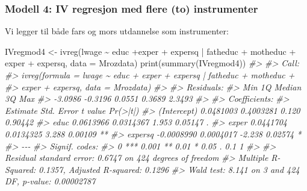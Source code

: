 \documentclass[
]{article}
\newenvironment{Shaded}{\begin{snugshade}}{\end{snugshade}}
\newcommand{\AttributeTok}[1]{\textcolor[rgb]{0.77,0.63,0.00}{#1}}
\newcommand{\CommentTok}[1]{\textcolor[rgb]{0.56,0.35,0.01}{\textit{#1}}}
\newcommand{\FunctionTok}[1]{\textcolor[rgb]{0.00,0.00,0.00}{#1}}
\newcommand{\NormalTok}[1]{#1}
\newcommand{\OtherTok}[1]{\textcolor[rgb]{0.56,0.35,0.01}{#1}}
\newcommand{\SpecialCharTok}[1]{\textcolor[rgb]{0.00,0.00,0.00}{#1}}
\begin{document}
\hypertarget{modell-4-iv-regresjon-med-flere-to-instrumenter}{%
\subsubsection{Modell 4: IV regresjon med flere (to) instrumenter}\label{modell-4-iv-regresjon-med-flere-to-instrumenter}}

Vi legger til både fars og mors utdannelse som instrumenter:

\begin{Shaded}
\begin{Highlighting}[]
\NormalTok{IVregmod4 }\OtherTok{\textless{}{-}} \FunctionTok{ivreg}\NormalTok{(lwage }\SpecialCharTok{\textasciitilde{}}\NormalTok{ educ  }\SpecialCharTok{+}\NormalTok{exper }\SpecialCharTok{+}\NormalTok{ expersq }\SpecialCharTok{|}\NormalTok{ fatheduc }\SpecialCharTok{+}\NormalTok{ motheduc }\SpecialCharTok{+}\NormalTok{ exper }\SpecialCharTok{+}\NormalTok{ expersq, }\AttributeTok{data =}\NormalTok{ Mrozdata)}
\FunctionTok{print}\NormalTok{(}\FunctionTok{summary}\NormalTok{(IVregmod4))}
\CommentTok{\#\textgreater{} }
\CommentTok{\#\textgreater{} Call:}
\CommentTok{\#\textgreater{} ivreg(formula = lwage \textasciitilde{} educ + exper + expersq | fatheduc + motheduc + }
\CommentTok{\#\textgreater{}     exper + expersq, data = Mrozdata)}
\CommentTok{\#\textgreater{} }
\CommentTok{\#\textgreater{} Residuals:}
\CommentTok{\#\textgreater{}     Min      1Q  Median      3Q     Max }
\CommentTok{\#\textgreater{} {-}3.0986 {-}0.3196  0.0551  0.3689  2.3493 }
\CommentTok{\#\textgreater{} }
\CommentTok{\#\textgreater{} Coefficients:}
\CommentTok{\#\textgreater{}               Estimate Std. Error t value Pr(\textgreater{}|t|)   }
\CommentTok{\#\textgreater{} (Intercept)  0.0481003  0.4003281   0.120  0.90442   }
\CommentTok{\#\textgreater{} educ         0.0613966  0.0314367   1.953  0.05147 . }
\CommentTok{\#\textgreater{} exper        0.0441704  0.0134325   3.288  0.00109 **}
\CommentTok{\#\textgreater{} expersq     {-}0.0008990  0.0004017  {-}2.238  0.02574 * }
\CommentTok{\#\textgreater{} {-}{-}{-}}
\CommentTok{\#\textgreater{} Signif. codes:  }
\CommentTok{\#\textgreater{} 0 \textquotesingle{}***\textquotesingle{} 0.001 \textquotesingle{}**\textquotesingle{} 0.01 \textquotesingle{}*\textquotesingle{} 0.05 \textquotesingle{}.\textquotesingle{} 0.1 \textquotesingle{} \textquotesingle{} 1}
\CommentTok{\#\textgreater{} }
\CommentTok{\#\textgreater{} Residual standard error: 0.6747 on 424 degrees of freedom}
\CommentTok{\#\textgreater{} Multiple R{-}Squared: 0.1357,  Adjusted R{-}squared: 0.1296 }
\CommentTok{\#\textgreater{} Wald test: 8.141 on 3 and 424 DF,  p{-}value: 0.00002787}
\end{Highlighting}
\end{Shaded}
\end{document}

